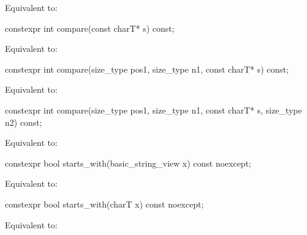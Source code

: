 \begin{itemdescr}
\pnum
\effects
Equivalent to: 
\end{itemdescr}

%
\begin{itemdecl}
constexpr int compare(const charT* s) const;
\end{itemdecl}

\begin{itemdescr}
\pnum
\effects
Equivalent to: 
\end{itemdescr}

%
\begin{itemdecl}
constexpr int compare(size_type pos1, size_type n1, const charT* s) const;
\end{itemdecl}

\begin{itemdescr}
\pnum
\effects
Equivalent to: 
\end{itemdescr}

%
\begin{itemdecl}
constexpr int compare(size_type pos1, size_type n1, const charT* s, size_type n2) const;
\end{itemdecl}

\begin{itemdescr}
\pnum
\effects
Equivalent to: 
\end{itemdescr}

%
\begin{itemdecl}
constexpr bool starts_with(basic_string_view x) const noexcept;
\end{itemdecl}

\begin{itemdescr}
\pnum
\effects
Equivalent to: 
\end{itemdescr}

%
\begin{itemdecl}
constexpr bool starts_with(charT x) const noexcept;
\end{itemdecl}

\begin{itemdescr}
\pnum
\effects
Equivalent to: 
\end{itemdescr}

